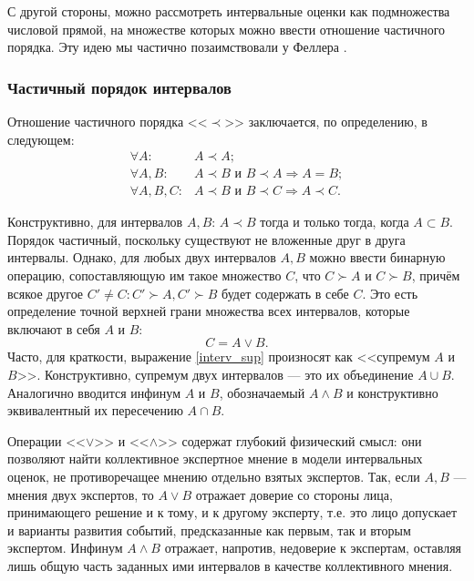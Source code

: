 С другой стороны, можно рассмотреть интервальные оценки как подмножества числовой прямой, на множестве которых можно ввести отношение частичного порядка. Эту идею мы частично позаимствовали у Феллера \cite{cit:feller}.

\subsubsection{Частичный порядок интервалов}
\label{order_int}

Отношение частичного порядка <<$\prec$>> заключается, по определению, в следующем:
\begin{equation}
\label{interv_order}
\begin{split}
\forall A: & A \prec A; \\
\forall A, B: & A \prec B \text{ и } B \prec A \Rightarrow A = B; \\
\forall A, B, C: & A \prec B \text{ и } B \prec C \Rightarrow A \prec C.
\end{split}
\end{equation}

Конструктивно, для интервалов $A, B$:  $A \prec B$ тогда и только тогда, когда $A \subset B$. Порядок частичный, поскольку существуют не вложенные друг в друга интервалы. Однако, для любых двух интервалов $A, B$ можно ввести бинарную операцию, сопоставляющую им такое множество $C$, что $C \succ A$ и $C \succ B$, причём всякое другое $C' \neq C: C' \succ A, C' \succ B$ будет содержать в себе $C$. Это есть определение точной верхней грани множества всех интервалов, которые включают в себя $A$ и $B$:
\begin{equation}
\label{interv_sup}
 C = A \vee B.
\end{equation}
Часто, для краткости, выражение \eqref{interv_sup} произносят как <<супремум  $A$ и $B$>>. Конструктивно, супремум двух интервалов --- это их объединение $A \cup B$. Аналогично вводится инфинум $A$ и $B$, обозначаемый $A \wedge B$ и конструктивно эквивалентный их пересечению $A \cap B$.

Операции <<$\vee$>> и <<$\wedge$>> содержат глубокий физический смысл: они позволяют найти коллективное экспертное мнение в модели интервальных оценок, не противоречащее мнению отдельно взятых экспертов. Так, если $A, B$ --- мнения двух экспертов, то $A \vee B$ отражает доверие со стороны лица, принимающего решение и к тому, и к другому эксперту, т.е. это лицо допускает и варианты развития событий, предсказанные как первым, так и вторым экспертом. Инфинум  $A \wedge B$ отражает, напротив, недоверие к экспертам, оставляя лишь общую часть заданных ими интервалов в качестве коллективного мнения.

